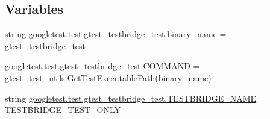 \subsection*{Variables}
\begin{DoxyCompactItemize}
\item 
string \mbox{\hyperlink{namespacegoogletest_1_1test_1_1gtest__testbridge__test_a59ccdbf94eb879ba6516ba5b6c72719d}{googletest.\+test.\+gtest\+\_\+testbridge\+\_\+test.\+binary\+\_\+name}} = \textquotesingle{}gtest\+\_\+testbridge\+\_\+test\+\_\+\textquotesingle{}
\item 
\mbox{\hyperlink{namespacegoogletest_1_1test_1_1gtest__testbridge__test_ad683cde9a7659541db7f4977ce799374}{googletest.\+test.\+gtest\+\_\+testbridge\+\_\+test.\+C\+O\+M\+M\+A\+ND}} = \mbox{\hyperlink{namespacegtest__test__utils_a89ed3717984a80ffbb7a9c92f71b86a2}{gtest\+\_\+test\+\_\+utils.\+Get\+Test\+Executable\+Path}}(binary\+\_\+name)
\item 
string \mbox{\hyperlink{namespacegoogletest_1_1test_1_1gtest__testbridge__test_a891a204293b2ba9434a8486ac154754d}{googletest.\+test.\+gtest\+\_\+testbridge\+\_\+test.\+T\+E\+S\+T\+B\+R\+I\+D\+G\+E\+\_\+\+N\+A\+ME}} = \textquotesingle{}T\+E\+S\+T\+B\+R\+I\+D\+G\+E\+\_\+\+T\+E\+S\+T\+\_\+\+O\+N\+LY\textquotesingle{}
\end{DoxyCompactItemize}
